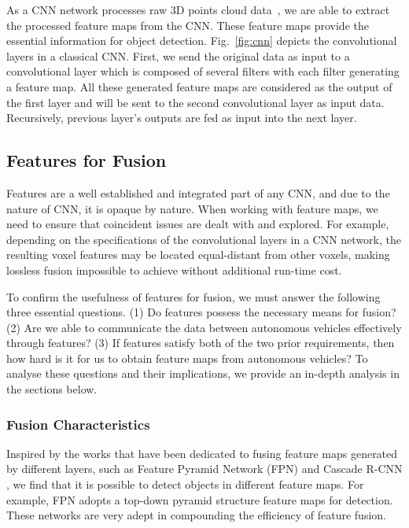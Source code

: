 \documentclass[sigconf]{acmart}
\begin{document}
As a CNN network processes raw 3D points cloud data~\cite{ren2017object}, we are able to extract the processed feature maps from the CNN. 
These feature maps provide the essential information for object detection. Fig.~\ref{fig:cnn}  depicts the convolutional layers in a classical CNN. First, we send the original data as input to a convolutional layer which is composed of several filters with each filter generating a feature map. All these generated feature maps are considered as the output of the first layer and will be sent to the second convolutional layer as input data. Recursively, previous layer's outputs are fed as input into the next layer. 








\subsection{\textbf{Features for Fusion}}




Features are a well established and integrated part of any CNN, and due to the nature of CNN, it is opaque by nature. When working with feature maps, we need to ensure that coincident issues are dealt with and explored. 
For example, depending on the specifications of the convolutional layers in a CNN network, the resulting voxel features may be located equal-distant from other voxels, making lossless fusion impossible to achieve without additional run-time cost. 


To confirm the usefulness of features for fusion, we must answer the following three essential questions. (1) Do features possess the necessary means for fusion? (2) Are we able to communicate the data between autonomous vehicles effectively through features? (3) If features satisfy both of the two prior requirements, then how hard is it for us to obtain feature maps from autonomous vehicles?
To analyse these questions and their implications, we provide an in-depth analysis in the sections below.




\subsubsection{\textbf{Fusion Characteristics}}


Inspired by the works that have been dedicated to fusing feature maps generated by different layers, such as Feature Pyramid Network (FPN) \cite{lin2017feature} and Cascade R-CNN \cite{cai2018cascade}, we find that it is possible to detect objects in different feature maps. For example, FPN adopts a top-down pyramid structure feature maps for detection. These networks are very adept in compounding the efficiency of feature fusion.
\end{document}
